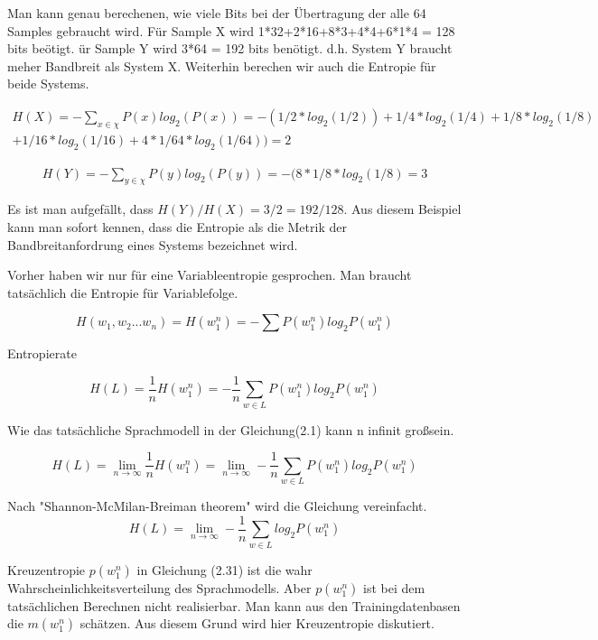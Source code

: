 Man kann genau berechenen, wie viele Bits bei der \"Ubertragung der alle 64 Samples gebraucht wird. F\"ur Sample X wird 1*32+2*16+8*3+4*4+6*1*4 = 128 bits be\"otigt. \"ur Sample Y wird 3*64 = 192 bits ben\"otigt. d.h. System Y braucht meher Bandbreit als System X. Weiterhin berechen wir auch die Entropie f\"ur beide Systems.

\begin{multline}
H(X)=-\sum_{x\in\chi}P(x)log_{2}(P(x))=-(1/2*log_{2}(1/2))+1/4*log_{2}(1/4)+1/8*log_{2}(1/8)\\
+1/16*log_{2}(1/16)+4*1/64*log_{2}(1/64))=2
\end{multline}

\begin{multline}
H(Y)=-\sum_{y\in\chi}P(y)log_{2}(P(y))=-(8*1/8*log_{2}(1/8)=3
\end{multline}

Es ist man aufgef\"allt, dass $H(Y)/H(X)=3/2=192/128$. Aus diesem Beispiel kann man sofort kennen, dass die Entropie als die Metrik der Bandbreitanfordrung eines Systems bezeichnet wird.
   
Vorher haben wir nur f\"ur eine Variableentropie gesprochen. Man braucht tats\"achlich die Entropie f\"ur Variablefolge.

\begin{equation}
H(w_{1},w_{2}...w_{n})=H(w_{1}^{n})=-\sum{P(w_{1}^{n})log_{2}P(w_{1}^{n})}
\end{equation}

Entropierate

\begin{equation}
H(L)=\frac{1}{n}H(w_{1}^{n})=-\frac{1}{n}\sum_{w\in L}P(w_{1}^{n})log_{2}P(w_{1}^{n})
\end{equation}

Wie das tats\"achliche Sprachmodell in der Gleichung(2.1) kann n infinit gro\ss sein.

\begin{equation}
H(L)=\lim_{n\to\infty}\frac{1}{n}H(w_{1}^{n})=\lim_{n\to\infty}-\frac{1}{n}\sum_{w\in L}P(w_{1}^{n})log_{2}P(w_{1}^{n})
\end{equation}

Nach "Shannon-McMilan-Breiman theorem" wird die Gleichung vereinfacht.
\begin{equation}
H(L)=\lim_{n\to\infty}-\frac{1}{n}\sum_{w\in L}log_{2}P(w_{1}^{n})
\end{equation}

Kreuzentropie
$p(w_{1}^{n})$ in Gleichung (2.31) ist die wahr Wahrscheinlichkeitsverteilung des Sprachmodells. Aber $p(w_{1}^{n})$ ist bei dem tats\"achlichen Berechnen nicht realisierbar. Man kann aus den Trainingdatenbasen die $m(w_{1}^{n})$ sch\"atzen. Aus diesem Grund  wird hier Kreuzentropie diskutiert.

